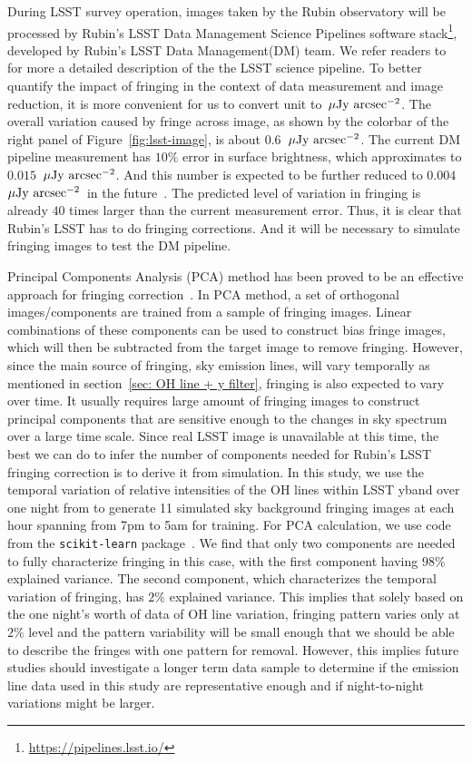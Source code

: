 \documentclass[twocolumn]{aastex63} %
\newcommand{\ujyac}{$\mu\rm{Jy}\ \rm{arcsec}^{-2}$}
\begin{document}
\begin{CJK*}{UTF8}{gbsn}
During LSST survey operation, images taken by the Rubin observatory will be processed by Rubin's LSST Data Management Science Pipelines software stack\footnote{\url{https://pipelines.lsst.io/}}, developed by Rubin's LSST Data Management(DM) team. We refer readers to ~\citet{Bos18} for more a detailed description of the the LSST science pipeline. To better quantify the impact of fringing in the context of data measurement and image reduction, it is more convenient for us to convert unit to~\ujyac. The overall variation caused by fringe across image, as shown by the colorbar of the right panel of Figure~\ref{fig:lsst-image}, is about 0.6~\ujyac.
The current DM pipeline measurement has $10\%$ error in surface brightness, which approximates to $0.015$~\ujyac. And this number is expected to be further reduced to $0.004$~\ujyac~in the future~\citep{rlh}. The predicted level of variation in fringing is already $40$ times larger than the current measurement error. Thus, it is clear that Rubin's LSST has to do fringing corrections. And it will be necessary to simulate fringing images to test the DM pipeline.

Principal Components Analysis (PCA) method has been proved to be an effective approach for fringing correction~\citep{Waters20,Medford21}. In PCA method, a set of orthogonal images/components are trained from a sample of fringing images. Linear combinations of these components can be used to construct bias fringe images, which will then be subtracted from the target image to remove fringing. However, since the main source of fringing, sky emission lines, will vary temporally as mentioned in section~\ref{sec: OH line + y filter}, fringing is also expected to vary over time. It usually requires large amount of fringing images to construct principal components that are sensitive enough to the changes in sky spectrum over a large time scale. Since real LSST image is unavailable at this time, the best we can do to infer the number of components needed for Rubin's LSST fringing correction is to derive it from simulation. In this study, we use the temporal variation of relative intensities of the OH lines within LSST yband over one night from \citet{Noll15} to generate 11 simulated sky background fringing images at each hour spanning from 7pm to 5am for training. For PCA calculation, we use code from the \verb|scikit-learn| package~\citep{scikit-learn}. We find that only two components are needed to fully characterize fringing in this case, with the first component having $98\%$ explained variance. The second component, which characterizes the temporal variation of fringing, has $2\%$ explained variance. This implies that solely based on the one night's worth of data of OH line variation, fringing pattern varies only at $2\%$ level and the pattern variability will be small enough that we should be able to describe the fringes with one pattern for removal. However, this implies future studies should investigate a longer term data sample to determine if the emission line data used in this study are representative enough and if night-to-night variations might be larger.


\end{CJK*}
\end{document}
